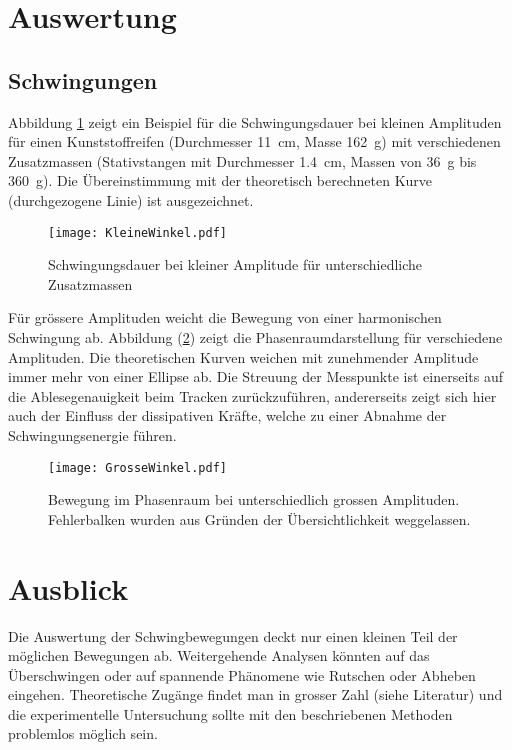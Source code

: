 \documentclass[11pt,a4paper]{article} %
\begin{document}
\section{Auswertung}

\subsection{Schwingungen}

Abbildung \ref{fig:klein} zeigt ein Beispiel für die Schwingungsdauer bei kleinen Amplituden für einen Kunststoffreifen (Durchmesser \SI{11}{cm}, Masse \SI{162}{g}) mit verschiedenen Zusatzmassen (Stativstangen mit Durchmesser \SI{1.4}{cm}, Massen von \SI{36}{g} bis \SI{360}{g}). Die Übereinstimmung mit der theoretisch berechneten Kurve (durchgezogene Linie) ist ausgezeichnet.

\begin{figure}[H]
\texttt{[image: KleineWinkel.pdf]}
\caption{Schwingungsdauer bei kleiner Amplitude für unterschiedliche Zusatzmassen}
\label{fig:klein}
\end{figure}

Für grössere Amplituden weicht die Bewegung von einer harmonischen Schwingung ab. Abbildung (\ref{fig:gross}) zeigt die Phasenraumdarstellung für verschiedene Amplituden. Die theoretischen Kurven weichen mit zunehmender Amplitude immer mehr von einer Ellipse ab. Die Streuung der Messpunkte ist einerseits auf die Ablesegenauigkeit beim Tracken zurückzuführen, andererseits zeigt sich hier auch der Einfluss der dissipativen Kräfte, welche zu einer Abnahme der Schwingungsenergie führen.

\begin{figure}[H]
\texttt{[image: GrosseWinkel.pdf]}
\caption{Bewegung im Phasenraum bei unterschiedlich grossen Amplituden. Fehlerbalken wurden aus Gründen der Übersichtlichkeit weggelassen.}
\label{fig:gross}
\end{figure}

\section{Ausblick}

Die Auswertung der Schwingbewegungen deckt  nur einen kleinen Teil der möglichen Bewegungen ab. Weitergehende Analysen könnten auf das Überschwingen oder auf spannende Phänomene wie Rutschen oder Abheben eingehen. Theoretische Zugänge findet man in grosser Zahl (siehe Literatur) und die experimentelle Untersuchung sollte mit den beschriebenen Methoden problemlos möglich sein.
\end{document}
